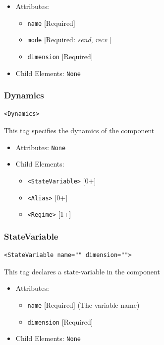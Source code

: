 \documentclass{article}
\begin{document}
\begin{itemize}
\item Attributes:
%
\begin{itemize}
\item \verb|name| {[}Required{]}
\item \verb|mode| {[}Required: \emph{send}, \emph{recv} {]}
\item \verb|dimension| {[}Required{]}
\end{itemize}

\item Child Elements: \texttt{None}
\end{itemize}




\subsubsection{Dynamics}
%
\begin{lstlisting}
<Dynamics>
\end{lstlisting}

This tag specifies the dynamics of the component

\begin{itemize}
\item Attributes: \texttt{None}

\item Child Elements:
%
\begin{itemize}
\item \verb|<StateVariable>| {[}0+{]}
\item \verb|<Alias>| {[}0+{]}
\item \verb|<Regime>| {[}1+{]}
\end{itemize}

\end{itemize}



\subsubsection{StateVariable}
%
\begin{lstlisting}
<StateVariable name="" dimension="">
\end{lstlisting}

This tag declares a state-variable in the component

\begin{itemize}
\item Attributes:
%
\begin{itemize}
\item \verb|name| {[}Required{]} (The variable name)
\item \verb|dimension| {[}Required{]}
\end{itemize}

\item Child Elements: \texttt{None}
\end{itemize}
\end{document}
